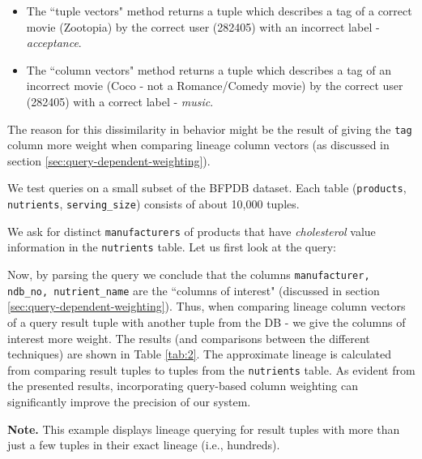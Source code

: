 \begin{example-withrun}
\begin{itemize}
    \item The ``tuple vectors" method returns a tuple which describes a tag of a correct movie (Zootopia) by the correct user (282405) with an incorrect label - \textit{acceptance}.
    \item The ``column vectors" method returns a tuple which describes a tag of an incorrect movie (Coco - not a Romance/Comedy movie) by the correct user (282405) with a correct label - \textit{music}.
\end{itemize}
The reason for this dissimilarity in behavior might be the result of giving the \texttt{tag} column more weight when comparing lineage column vectors (as discussed in section \ref{sec:query-dependent-weighting}).

\end{example-withrun}


\begin{runexample}
We test queries on a small subset of the BFPDB dataset. Each table (\texttt{products}, \texttt{nutrients}, \texttt{serving\_size}) consists of about 10,000 tuples.
\end{runexample}

\begin{example-withrun}\label{experiment:2}
% 
We ask for distinct \texttt{manufacturers} of products that have \textit{cholesterol} value information in the \texttt{nutrients} table. Let us first look at the query:


Now, by parsing the query we conclude that the columns \texttt{manufacturer, ndb\_no, nutrient\_name} are the ``columns of interest" (discussed in section \ref{sec:query-dependent-weighting}). Thus, when comparing lineage column vectors of a query result tuple with another tuple from the DB - we give the columns of interest more weight. The results (and comparisons between the different techniques) are shown in Table \ref{tab:2}. The approximate lineage is calculated from comparing result tuples to tuples from the \texttt{nutrients} table. As evident from the presented results, incorporating query-based column weighting can significantly improve the precision of our system. 
\par\textbf{Note.} This example displays lineage querying for result tuples with more than just a few tuples in their exact lineage (i.e., hundreds).

\end{example-withrun}

